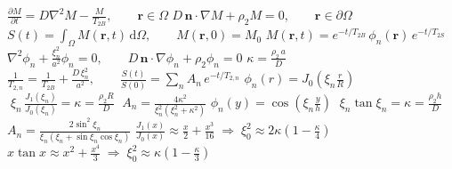 \documentclass[border=3pt,multi=eqpage]{standalone}
\newenvironment{eqpage}{$\displaystyle}{$}
\begin{document}
\begin{eqpage}\frac{\partial M}{\partial t}=D\nabla^{2}M-\frac{M}{T_{2B}},\qquad \mathbf r\in\Omega\end{eqpage}
\begin{eqpage}D\,\mathbf n\cdot\nabla M+\rho_2 M=0,\qquad \mathbf r\in\partial\Omega\end{eqpage}
\begin{eqpage}S(t)=\int_\Omega M(\mathbf r,t)\,\mathrm d\Omega,\qquad M(\mathbf r,0)=M_0\end{eqpage}
\begin{eqpage}M(\mathbf r,t)=e^{-t/T_{2B}}\,\phi_n(\mathbf r)\,e^{-t/T_{2S}}\end{eqpage}
\begin{eqpage}\nabla^2\phi_n+\frac{\xi_n^2}{a^2}\phi_n=0,\qquad D\,\mathbf n\cdot\nabla\phi_n+\rho_2\phi_n=0\end{eqpage}
\begin{eqpage}\kappa=\frac{\rho_2\,a}{D}\end{eqpage}
\begin{eqpage}\frac{1}{T_{2,n}}=\frac{1}{T_{2B}}+\frac{D\,\xi_n^2}{a^2},\qquad \frac{S(t)}{S(0)}=\sum_{n}A_n\,e^{-t/T_{2,n}}\end{eqpage}
\begin{eqpage}\phi_n(r)=J_0\!\left(\xi_n\frac{r}{R}\right)\end{eqpage}
\begin{eqpage}\boxed{\;\xi_n\,\frac{J_1(\xi_n)}{J_0(\xi_n)}=\kappa=\frac{\rho_2R}{D}\;}\end{eqpage}
\begin{eqpage}A_n=\frac{4\kappa^2}{\xi_n^2\left(\xi_n^2+\kappa^2\right)}\end{eqpage}
\begin{eqpage}\phi_n(y)=\cos\!\left(\xi_n\frac{y}{h}\right)\end{eqpage}
\begin{eqpage}\boxed{\;\xi_n\tan\xi_n=\kappa=\frac{\rho_2h}{D}\;}\end{eqpage}
\begin{eqpage}A_n=\frac{2\sin^2\xi_n}{\xi_n\left(\xi_n+\sin\xi_n\cos\xi_n\right)}\end{eqpage}
\begin{eqpage}\frac{J_1(x)}{J_0(x)}\approx\frac{x}{2}+\frac{x^3}{16}\;\Longrightarrow\;\xi_0^2\approx2\kappa\left(1-\frac{\kappa}{4}\right)\end{eqpage}
\begin{eqpage}x\tan x\approx x^2+\frac{x^4}{3}\;\Longrightarrow\;\xi_0^2\approx\kappa\left(1-\frac{\kappa}{3}\right)\end{eqpage}
\end{document}
